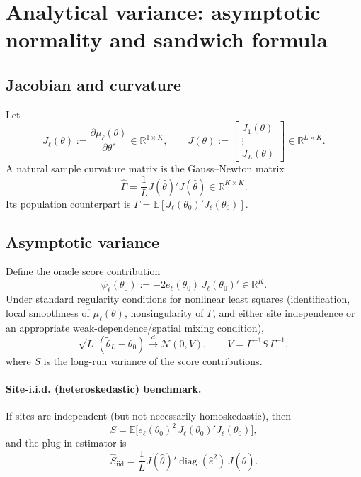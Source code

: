 \documentclass[11pt]{article}
\newcommand{\E}{\mathbb{E}}
\newcommand{\R}{\mathbb{R}}
\begin{document}
\section{Analytical variance: asymptotic normality and sandwich formula}

\subsection{Jacobian and curvature}

Let
\[
J_\ell(\theta) := \frac{\partial \mu_\ell(\theta)}{\partial \theta'} \in \R^{1\times K},
\qquad
J(\theta) := \begin{bmatrix}J_1(\theta)\\ \vdots \\ J_L(\theta)\end{bmatrix} \in \R^{L\times K}.
\]
A natural sample curvature matrix is the Gauss--Newton matrix
\begin{equation}
\hat\Gamma
= \frac{1}{L} J(\hat\theta)'J(\hat\theta) \in \R^{K\times K}.
\label{eq:gammahat}
\end{equation}
Its population counterpart is $\Gamma = \E[J_\ell(\theta_0)'J_\ell(\theta_0)]$.

\subsection{Asymptotic variance}

Define the oracle score contribution
\[
\psi_\ell(\theta_0)
:= -2 e_\ell(\theta_0)\, J_\ell(\theta_0)' \in \R^K.
\]
Under standard regularity conditions for nonlinear least squares
(identification, local smoothness of $\mu_\ell(\theta)$, nonsingularity of
$\Gamma$, and either site independence or an appropriate weak-dependence/spatial
mixing condition),
\begin{equation}
\sqrt{L}\,(\tilde\theta_L - \theta_0)
\xrightarrow{d}
\mathcal{N}(0, V),
\qquad
V = \Gamma^{-1} S\, \Gamma^{-1},
\label{eq:asymnormal}
\end{equation}
where $S$ is the long-run variance of the score contributions.

\paragraph{Site-i.i.d. (heteroskedastic) benchmark.}
If sites are independent (but not necessarily homoskedastic), then
\[
S = \E\bigl[ e_\ell(\theta_0)^2\,J_\ell(\theta_0)'J_\ell(\theta_0)\bigr],
\]
and the plug-in estimator is
\begin{equation}
\hat S_{\mathrm{iid}}
= \frac{1}{L} J(\hat\theta)' \operatorname{diag}(\hat e^2)\, J(\hat\theta).
\label{eq:meat_iid}
\end{equation}
\end{document}
